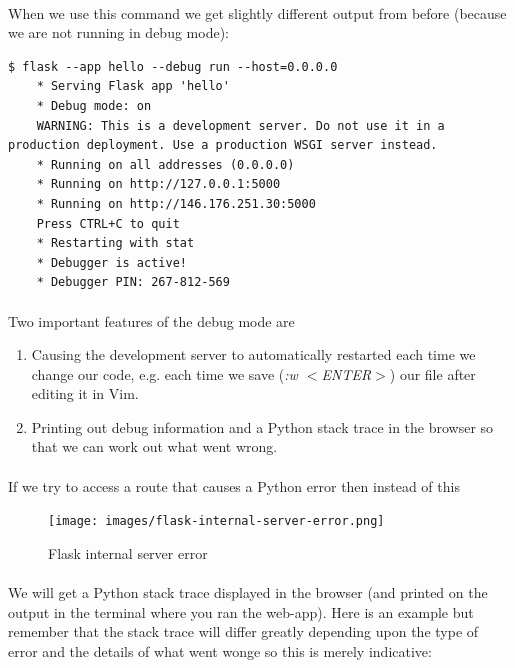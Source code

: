 \documentclass[12pt, a4paper, oneside]{book}
\begin{document}
\paragraph{} When we use this command we get slightly different output from before (because we are not running in debug mode):

\begin{lstlisting}[style=DOS]
    $ flask --app hello --debug run --host=0.0.0.0
    * Serving Flask app 'hello'
    * Debug mode: on
    WARNING: This is a development server. Do not use it in a production deployment. Use a production WSGI server instead.
    * Running on all addresses (0.0.0.0)
    * Running on http://127.0.0.1:5000
    * Running on http://146.176.251.30:5000
    Press CTRL+C to quit
    * Restarting with stat
    * Debugger is active!
    * Debugger PIN: 267-812-569
\end{lstlisting}



\paragraph{} Two important features of the debug mode are

\begin{enumerate}
\item Causing the development server to automatically restarted each time we change our code, e.g. each time we save (\emph{:w $<$ENTER$>$}) our file after editing it in Vim.
\item Printing out debug information and a Python stack trace in the browser so that we can work out what went wrong.
\end{enumerate}

\paragraph{} If we try to access a route that causes a Python error then instead of this

\begin{figure}[H]
\centering
\texttt{[image: images/flask-internal-server-error.png]}
\caption{Flask internal server error}
\label{fig:flask-internal-server-error}
\end{figure}
 \paragraph{} We will get a Python stack trace displayed in the browser (and printed on the output in the terminal where you ran the web-app). Here is an example but remember that the stack trace will differ greatly depending upon the type of error and the details of what went wonge so this is merely indicative:
\end{document}

